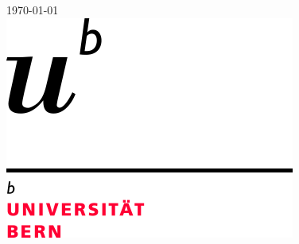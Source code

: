 \documentclass[
11pt, %
english, %
singlespacing, %
headsepline, %
]{MastersDoctoralThesis} %
\begin{document}
\begin{titlepage}
\begin{center}
{\large \today}\\[2cm] %
\includegraphics[scale=0.4]{Logo} %
 
\vfill
\end{center}
\end{titlepage}





 


\end{document}
